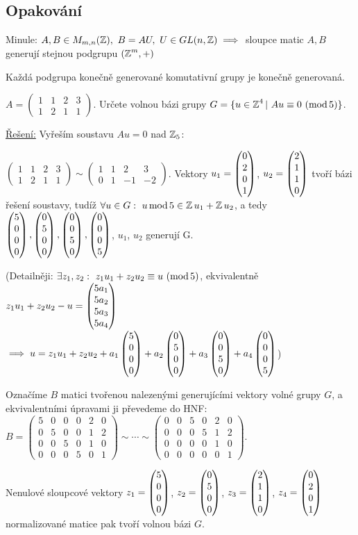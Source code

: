 \subsection*{Opakování}
Minule: $A,B \in M_{m,n}(\operatorname{\mathbb{Z}}), \ B = AU, \ U \in GL(n,\operatorname{\mathbb{Z}}) \implies$ sloupce matic $A,B$ generují stejnou podgrupu $(\operatorname{\mathbb{Z}}^m,+)$

\begin{note}
Každá podgrupa konečně generované komutativní grupy je konečně generovaná.
\end{note} 

\begin{example}
$A = 
\begin{pmatrix}
1 & 1 & 2 & 3\\
1 & 2 & 1 & 1
\end{pmatrix}$.
Určete volnou bázi grupy $G=\{u\in\operatorname{\mathbb{Z}}^4| \ Au\equiv0 \ (\operatorname{mod} 5)\}$.

\underline{Řešení:} Vyřeším soustavu $Au=0$ nad $\operatorname{\mathbb{Z}}_5$:

$\begin{pmatrix}
1 & 1 & 2 & 3\\
1 & 2 & 1 & 1
\end{pmatrix}
\sim
\begin{pmatrix}
1 & 1 & 2 & 3\\
0 & 1 & -1 & -2
\end{pmatrix}$. Vektory 
$u_1=\begin{pmatrix} 0 \\ 2 \\ 0 \\ 1 \end{pmatrix}$, $u_2=\begin{pmatrix} 2 \\ 1 \\ 1 \\ 0 \end{pmatrix}$ tvoří bázi řešení soustavy, tudíž $\forall u\in G: \ u \operatorname{mod} 5 \in \operatorname{\mathbb{Z}} u_1 + \operatorname{\mathbb{Z}} u_2$, a tedy
$\begin{pmatrix} 5 \\ 0 \\ 0 \\ 0 \end{pmatrix},\begin{pmatrix} 0 \\ 5 \\ 0 \\ 0 \end{pmatrix},\begin{pmatrix} 0 \\ 0 \\ 5 \\ 0 \end{pmatrix},\begin{pmatrix} 0 \\ 0 \\ 0 \\ 5 \end{pmatrix}$, $u_1$, $u_2$ generují G.

(Detailněji: $\exists z_1, z_2: \ z_1u_1 + z_2u_2\equiv u \ (\operatorname{mod} 5)$, ekvivalentně
$z_1 u_1 + z_2 u_2-u=\begin{pmatrix} 5a_1 \\ 5a_2 \\ 5a_3 \\ 5a_4 \end{pmatrix}$\\$\implies u=z_1u_1+z_2u_2+a_1 \begin{pmatrix} 5 \\ 0 \\ 0 \\ 0 \end{pmatrix} + a_2 \begin{pmatrix} 0 \\ 5 \\ 0 \\ 0 \end{pmatrix} + a_3 \begin{pmatrix} 0 \\ 0 \\ 5 \\ 0 \end{pmatrix}+ a_4\begin{pmatrix} 0 \\ 0 \\ 0 \\ 5 \end{pmatrix}
$)

Označíme $B$ matici tvořenou nalezenými generujícími vektory volné grupy $G$, a ekvivalentními úpravami ji převedeme do HNF:
$B =
\begin{pmatrix}
5 & 0 & 0 & 0 & 2 & 0\\
0 & 5 & 0 & 0 & 1 & 2\\
0 & 0 & 5 & 0 & 1 & 0\\
0 & 0 & 0 & 5 & 0 & 1
\end{pmatrix}
\sim\cdots\sim
\begin{pmatrix}
0 & 0 & 5 & 0 & 2 & 0\\
0 & 0 & 0 & 5 & 1 & 2\\
0 & 0 & 0 & 0 & 1 & 0\\
0 & 0 & 0 & 0 & 0 & 1
\end{pmatrix}
$.

Nenulové sloupcové vektory $z_1=\begin{pmatrix} 5 \\ 0 \\ 0 \\ 0 \end{pmatrix}$, $z_2=\begin{pmatrix} 0 \\ 5 \\ 0 \\ 0 \end{pmatrix}$, $z_3=\begin{pmatrix} 2 \\ 1 \\ 1 \\ 0 \end{pmatrix}$, $z_4=\begin{pmatrix} 0 \\ 2 \\ 0 \\ 1 \end{pmatrix}$ normalizované matice pak tvoří volnou bázi $G$.
\end{example}

